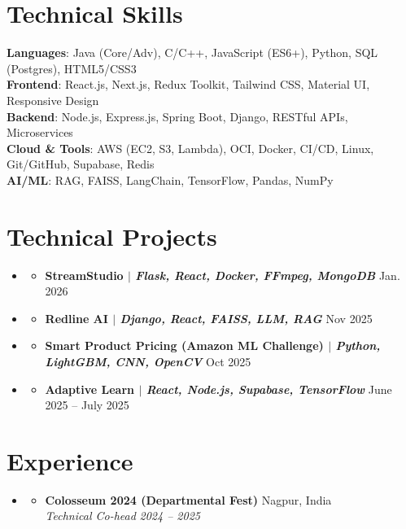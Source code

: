 \documentclass[letterpaper,11pt]{article}
\newcommand{\resumeSubheading}[4]{
  \vspace{-1pt}\item
    \begin{itemize}[leftmargin=0in, label={}]
      \item
      \textbf{#1} \hfill #2 \\
      \textit{\small#3} \hfill \textit{\small #4} \\
    \end{itemize}\vspace{-6pt}
}
\newcommand{\resumeProjectHeading}[2]{
    \item
    \begin{itemize}[leftmargin=0in, label={}]
        \item
      \small\textbf{#1} \hfill #2 \\
    \end{itemize}\vspace{-6pt}
}
\newcommand{\resumeSubHeadingListStart}{\begin{itemize}[leftmargin=0.15in, label={}, itemsep=-1pt]}
\newcommand{\resumeSubHeadingListEnd}{\end{itemize}}
\newcommand{\resumeItemListStart}{\begin{itemize}[itemsep=0pt]}
\newcommand{\resumeItemListEnd}{\end{itemize}\vspace{-5pt}}
\begin{document}
\section{Technical Skills}
 \begin{itemize}[leftmargin=0.15in, label={}]
    \small{\item{
     \textbf{Languages}{: Java (Core/Adv), C/C++, JavaScript (ES6+), Python, SQL (Postgres), HTML5/CSS3} \\ \vspace{2pt}
     \textbf{Frontend}{: React.js, Next.js, Redux Toolkit, Tailwind CSS, Material UI, Responsive Design} \\ \vspace{2pt}
     \textbf{Backend}{: Node.js, Express.js, Spring Boot, Django, RESTful APIs, Microservices} \\ \vspace{2pt}
     \textbf{Cloud \& Tools}{: AWS (EC2, S3, Lambda), OCI, Docker, CI/CD, Linux, Git/GitHub, Supabase, Redis} \\ \vspace{2pt}
     \textbf{AI/ML}{: RAG, FAISS, LangChain, TensorFlow, Pandas, NumPy}
    }}
 \end{itemize}


\section{Technical Projects}
    \resumeSubHeadingListStart
         \resumeProjectHeading
    {StreamStudio $|$ \emph{Flask, React, Docker, FFmpeg, MongoDB}}{Jan. 2026}
    \resumeItemListStart
    \resumeItemListEnd
    
      \resumeProjectHeading
          {Redline AI $|$ \emph{Django, React, FAISS, LLM, RAG}}{Nov 2025}
          \resumeItemListStart
          \resumeItemListEnd

      \resumeProjectHeading
    {\textbf{Smart Product Pricing (Amazon ML Challenge)} $|$ \emph{Python, LightGBM, CNN, OpenCV}}{Oct 2025}
    \resumeItemListStart
    \resumeItemListEnd
    
      \resumeProjectHeading
          {Adaptive Learn $|$ \emph{React, Node.js, Supabase, TensorFlow}}{June 2025 -- July 2025}
          \resumeItemListStart
          \resumeItemListEnd
    \resumeSubHeadingListEnd

\section{Experience}
  \resumeSubHeadingListStart
    \resumeSubheading
      {Colosseum 2024 (Departmental Fest)}{Nagpur, India}
      {Technical Co-head}{2024 -- 2025}
      \resumeItemListStart
      \resumeItemListEnd
  \resumeSubHeadingListEnd

\end{document}
